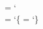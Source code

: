

\def\lesscharacter {<}
\def\morecharacter {>}

\chardef\texescape     = `\\
\chardef\leftargument  = `\{
\chardef\rightargument = `\}



